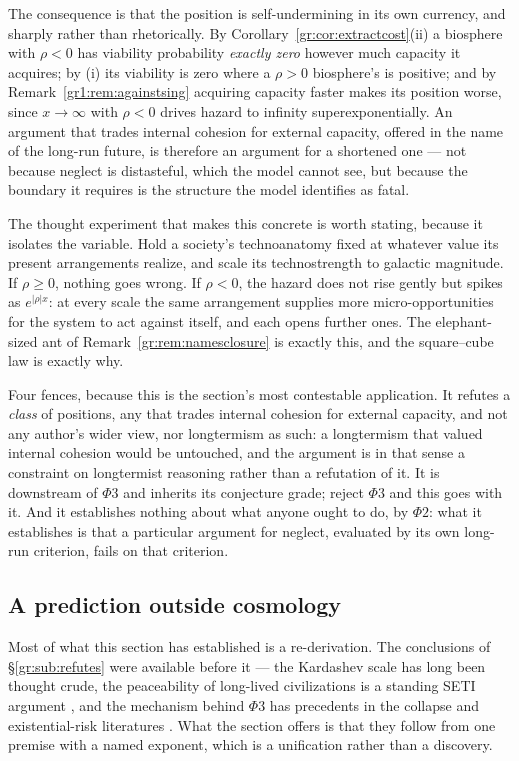 \documentclass[11pt]{article}
\numberwithin{equation}{section}
\theoremstyle{plain}
\theoremstyle{definition}
\theoremstyle{remark}
\begin{document}
The consequence is that the position is self-undermining in its own
currency, and sharply rather than rhetorically. By
Corollary~\ref{gr:cor:extractcost}(ii) a biosphere with $\rho<0$ has
viability probability \emph{exactly zero} however much capacity it
acquires; by (i) its viability is zero where a $\rho>0$ biosphere's is
positive; and by
Remark~\ref{gr1:rem:againstsing} acquiring capacity faster makes its
position worse, since $x\to\infty$ with $\rho<0$ drives hazard to
infinity superexponentially. An argument that trades internal cohesion
for external capacity, offered in the name of the long-run future, is
therefore an argument for a shortened one --- not because neglect is
distasteful, which the model cannot see, but because the boundary it
requires is the structure the model identifies as fatal.

The thought experiment that makes this concrete is worth stating,
because it isolates the variable. Hold a society's technoanatomy fixed
at whatever value its present arrangements realize, and scale its
technostrength to galactic magnitude. If $\rho\ge0$, nothing goes
wrong. If $\rho<0$, the hazard does not rise gently but spikes as
$e^{|\rho|x}$: at every scale the same arrangement supplies more
micro-opportunities for the system to act against itself, and each
opens further ones. The elephant-sized ant of
Remark~\ref{gr:rem:namesclosure} is exactly this, and the square--cube
law is exactly why.

Four fences, because this is the section's most contestable
application. It refutes a \emph{class} of positions, any that trades
internal cohesion for external capacity, and not any author's wider
view, nor longtermism as such: a longtermism that valued internal
cohesion would be untouched, and the argument is in that sense a
constraint on longtermist reasoning rather than a refutation of it. It is downstream of $\Phi3$ and inherits its conjecture grade;
reject $\Phi3$ and this goes with it. And it establishes nothing about
what anyone ought to do, by $\Phi2$: what it establishes is that a
particular argument for neglect, evaluated by its own long-run
criterion, fails on that criterion.

\subsection{A prediction outside cosmology}\label{gr:sub:crossdomain}

Most of what this section has established is a re-derivation. The
conclusions of \S\ref{gr:sub:refutes} were available before it --- the
Kardashev scale has long been thought crude, the peaceability of
long-lived civilizations is a standing SETI argument
\cite{Cooper19}, and the mechanism behind $\Phi3$ has precedents in
the collapse and existential-risk literatures
\cite{Tainter88,Bostrom19}. What the section offers is that they follow
from one premise with a named exponent, which is a unification rather
than a discovery.
\end{document}
